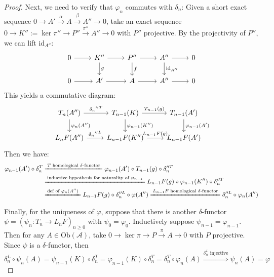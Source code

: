 \begin{proof}
    Next, we need to verify that $\varphi_n$ commutes with $\delta_n$: Given a short exact sequence $0\to A'\xrightarrow{\alpha} A\xrightarrow{\beta} A''\to0$, take an exact sequence $0\to K'':= \ker \pi'' \to P''\xrightarrow{\pi''} A''\to0$ with $P''$ projective. By the projectivity of $P''$, we can lift $\text{id}_{A''}$:
    \[
    \begin{tikzcd}
        0\arrow[r] &K'' \arrow[r] \arrow[d, "g"] &P'' \arrow[r] \arrow[d, "f"] &A'' \arrow[r] \arrow[d, "\text{id}_{A''}"] &0\\
        0\arrow[r] &A' \arrow[r] &A\arrow[r] &A''\arrow[r]&0
    \end{tikzcd}
    \]
    This yields a commutative diagram:
    \[
    \begin{tikzcd}
        T_n(A'') \arrow[r, "\delta_n{''}^T"] \arrow[d, "\varphi_n(A{''})"] &T_{n-1} (K) \arrow[r, "T_{n-1}(g)"] \arrow[d, "\varphi_{n-1} (K{''})"] &T_{n-1} (A')\arrow[d, "\varphi_{n-1} (A{'})"]\\
        L_nF(A'') \arrow[r, "\delta_n{''}^L"] &L_{n-1}F(K'') \arrow[r, "L_{n-1} F(g)"] &L_{n-1} F(A')
    \end{tikzcd}
    \]
    Then we have:
    \begin{align*}
        \varphi_{n-1} (A') \circ \delta_n^T &\xlongequal{T \text{ homological }\delta \text{-functor}} \varphi_{n-1} (A') \circ T_{n-1} (g) \circ \delta_n''^T \\
        &\xlongequal{\text{inductive hypothesis for naturality of }\varphi_{n-1}} L_{n-1} F(g) \circ \varphi_{n-1} (K'') \circ \delta_n''^T\\
        &\xlongequal{\text{def of }\varphi_n(A'')} L_{n-1} F(g) \circ \delta_n''^L \circ \varphi(A'') \xlongequal{L_{n-1}F \text{ homological }\delta \text{-functor}} \delta_n''^L\circ \varphi_n (A'')
    \end{align*}

    Finally, for the uniqueness of $\varphi$, suppose that there is another $\delta$-functor $\psi= (\psi_n:T_n \to L_nF)_{n\geq 0}$ with $\psi_0=\varphi_0$. Inductively suppose $\psi_{n-1} =\varphi_{n-1}$. Then for any $A\in \text{Ob} (\mathcal{A})$, take $0\to \ker \pi \to P\xrightarrow{\pi} A\to0$ with $P$ projective. Since $\psi$ is a $\delta$-functor, then
    \[
    \delta_n^L \circ \psi_n (A)= \psi_{n-1} (K) \circ \delta_n^T= \varphi_{n-1} (K) \circ \delta_n^T= \delta_n^T \circ \varphi_n(A) \overset{\delta_n^L \text{ injective}}{\Rightarrow} \psi_n (A)=\varphi
    \]
\end{proof}


